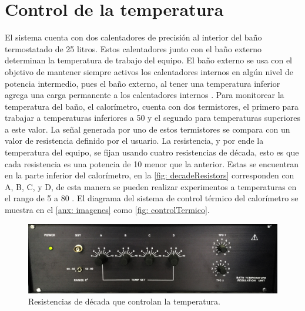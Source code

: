 
%




\chapter{Control de la temperatura}\label{ch: thermal}
	El sistema cuenta con dos calentadores de precisión al interior del baño termostatado de 25 litros. Estos calentadores junto con el ba\~no externo determinan la temperatura de trabajo del equipo. El ba\~no externo se usa con el objetivo de mantener siempre activos los calentadores internos en alg\'un nivel de potencia intermedio, pues el ba\~no externo, al tener una temperatura inferior agrega una carga permanente a los calentadores internos \cite{Suurkuusk}. Para monitorear la temperatura del ba\~no, el calor\'imetro, cuenta con dos termistores, el primero para trabajar a temperaturas inferiores a 50 \grad{} y el segundo para temperaturas superiores a este valor. La se\~nal generada por uno de estos termistores se compara con un valor de resistencia definido por el usuario. La resistencia, y por ende la temperatura del equipo, se fijan usando cuatro resistencias de década, esto es que cada resistencia es una potencia de 10 menor que la anterior. Estas se encuentran en la parte inferior del calor\'imetro, en la \autoref{fig: decadeResistors} corresponden con A, B, C, y D, de esta manera se pueden realizar experimentos a temperaturas en el rango de 5 a 80 \grad{}. El diagrama del sistema de control t\'ermico del calor\'imetro se muestra en el \autoref{anx: imagenes} como \autoref{fig: controlTermico}.
	
	\begin{figure}[h]
		\centering
		\includegraphics[width=0.7\linewidth]{Figures/decadeResistors}
		\caption{Resistencias de década que controlan la temperatura.}
		\label{fig: decadeResistors}
	\end{figure}
	

